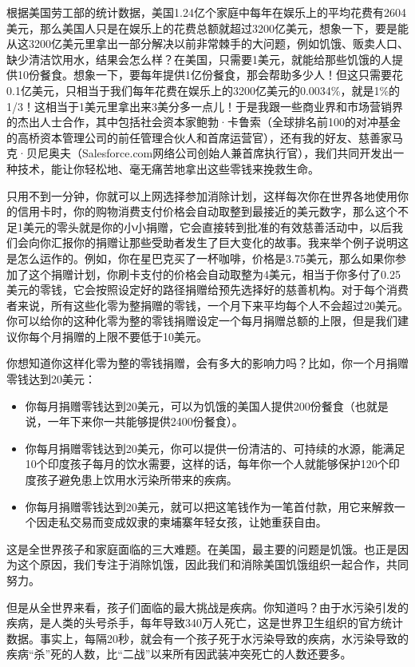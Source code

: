 根据美国劳工部的统计数据，美国1.24亿个家庭中每年在娱乐上的平均花费有2604美元，那么美国人只是在娱乐上的花费总额就超过3200亿美元，想象一下，要是能从这3200亿美元里拿出一部分解决以前非常棘手的大问题，例如饥饿、贩卖人口、缺少清洁饮用水，结果会怎么样？在美国，只需要1美元，就能给那些饥饿的人提供10份餐食。想象一下，要每年提供1亿份餐食，那会帮助多少人！但这只需要花0.1亿美元，只相当于我们每年花费在娱乐上的3200亿美元的0.0034\%，就是1\%的1/3！这相当于1美元里拿出来3美分多一点儿！于是我跟一些商业界和市场营销界的杰出人士合作，其中包括社会资本家鲍勃·卡鲁索（全球排名前100的对冲基金的高桥资本管理公司的前任管理合伙人和首席运营官），还有我的好友、慈善家马克·贝尼奥夫（Salesforce.com网络公司创始人兼首席执行官），我们共同开发出一种技术，能让你轻松地、毫无痛苦地拿出这些零钱来挽救生命。

只用不到一分钟，你就可以上网选择参加消除计划，这样每次你在世界各地使用你的信用卡时，你的购物消费支付价格会自动取整到最接近的美元数字，那么这个不足1美元的零头就是你的小小捐赠，它会直接转到批准的有效慈善活动中，以后我们会向你汇报你的捐赠让那些受助者发生了巨大变化的故事。我来举个例子说明这是怎么运作的。例如，你在星巴克买了一杯咖啡，价格是3.75美元，那么如果你参加了这个捐赠计划，你刷卡支付的价格会自动取整为4美元，相当于你多付了0.25美元的零钱，它会按照设定好的路径捐赠给预先选择好的慈善机构。对于每个消费者来说，所有这些化零为整捐赠的零钱，一个月下来平均每个人不会超过20美元。你可以给你的这种化零为整的零钱捐赠设定一个每月捐赠总额的上限，但是我们建议你每个月捐赠的上限不要低于10美元。

你想知道你这样化零为整的零钱捐赠，会有多大的影响力吗？比如，你一个月捐赠零钱达到20美元：

\begin{itemize}
\item 你每月捐赠零钱达到20美元，可以为饥饿的美国人提供200份餐食（也就是说，一年下来你一共能够提供2400份餐食）。
\item 你每月捐赠零钱达到20美元，你可以提供一份清洁的、可持续的水源，能满足10个印度孩子每月的饮水需要，这样的话，每年你一个人就能够保护120个印度孩子避免患上饮用水污染所带来的疾病。
\item 你每月捐赠零钱达到20美元，就可以把这笔钱作为一笔首付款，用它来解救一个因走私交易而变成奴隶的柬埔寨年轻女孩，让她重获自由。
\end{itemize}

这是全世界孩子和家庭面临的三大难题。在美国，最主要的问题是饥饿。也正是因为这个原因，我们专注于消除饥饿，因此我们和消除美国饥饿组织一起合作，共同努力。

但是从全世界来看，孩子们面临的最大挑战是疾病。你知道吗？由于水污染引发的疾病，是人类的头号杀手，每年导致340万人死亡，这是世界卫生组织的官方统计数据。事实上，每隔20秒，就会有一个孩子死于水污染导致的疾病，水污染导致的疾病“杀”死的人数，比“二战”以来所有因武装冲突死亡的人数还要多。


